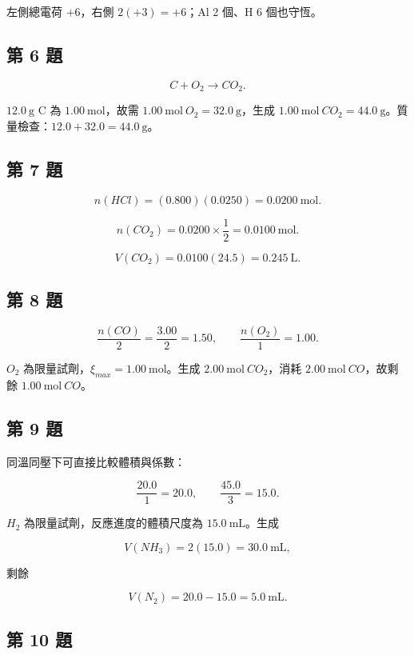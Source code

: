 \documentclass[11pt,a4paper]{article}
\begin{document}
左側總電荷 \(+6\)，右側 \(2(+3)=+6\)；Al 2 個、H 6 個也守恆。

\subsection{第 6 題}\label{ux7b2c-6-ux984c}

\[
C+O_2\rightarrow CO_2.
\]

\(12.0\ \mathrm g\) C 為 \(1.00\ \mathrm{mol}\)，故需 \(1.00\ \mathrm{mol}\ O_2=32.0\ \mathrm g\)，生成 \(1.00\ \mathrm{mol}\ CO_2=44.0\ \mathrm g\)。質量檢查：\(12.0+32.0=44.0\ \mathrm g\)。

\subsection{第 7 題}\label{ux7b2c-7-ux984c}

\[
n(HCl)=(0.800)(0.0250)=0.0200\ \mathrm{mol}.
\]

\[
n(CO_2)=0.0200\times\frac12=0.0100\ \mathrm{mol}.
\]

\[
V(CO_2)=0.0100(24.5)=0.245\ \mathrm L.
\]

\subsection{第 8 題}\label{ux7b2c-8-ux984c}

\[
\frac{n(CO)}2=\frac{3.00}{2}=1.50,
\qquad
\frac{n(O_2)}1=1.00.
\]

\(O_2\) 為限量試劑，\(\xi_{max}=1.00\ \mathrm{mol}\)。生成 \(2.00\ \mathrm{mol}\ CO_2\)，消耗 \(2.00\ \mathrm{mol}\ CO\)，故剩餘 \(1.00\ \mathrm{mol}\ CO\)。

\subsection{第 9 題}\label{ux7b2c-9-ux984c}

同溫同壓下可直接比較體積與係數：

\[
\frac{20.0}{1}=20.0,
\qquad
\frac{45.0}{3}=15.0.
\]

\(H_2\) 為限量試劑，反應進度的體積尺度為 \(15.0\ \mathrm{mL}\)。生成

\[
V(NH_3)=2(15.0)=30.0\ \mathrm{mL},
\]

剩餘

\[
V(N_2)=20.0-15.0=5.0\ \mathrm{mL}.
\]

\subsection{第 10 題}\label{ux7b2c-10-ux984c}
\end{document}
